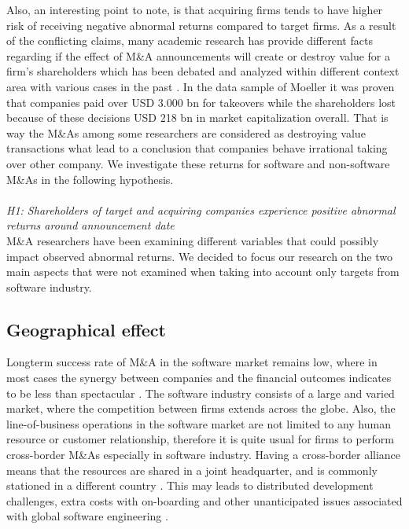Also, an interesting point to note, is that acquiring firms tends to have higher risk of receiving negative abnormal returns compared to target firms. As a result of the conflicting claims, many academic research has provide different facts regarding if the effect of M\&A announcements will create or destroy value for a firm's shareholders which has been debated and analyzed within different context area with various cases in the past \cite{Mateev}. In the data sample of Moeller \cite{MOELLER2005533} it was proven that companies paid over USD 3.000 bn for takeovers while the shareholders lost because of these decisions USD 218 bn in market capitalization overall. That is way the M\&As among some researchers are considered as destroying value transactions \cite{bieshaar2001deals,sundersanam2006} what lead to a conclusion that companies behave irrational taking over other company. We investigate these returns for software and non-software M\&As in the following hypothesis.
\\
\\
\textit{H1: Shareholders of target and acquiring companies experience positive abnormal returns around announcement date}
\\

M\&A researchers have been examining different variables that could possibly impact observed abnormal returns. We decided to focus our research on the two main aspects that were not examined when taking into account only targets from software industry.

\subsection{Geographical effect}

Longterm success rate of M\&A in the software market remains low, where in most cases the synergy between companies and the financial outcomes indicates to be less than spectacular \cite{McCarthy}. The software industry consists of a large and varied market, where the competition between firms extends across the globe. Also, the line-of-business operations in the software market are not limited to any human resource or customer relationship, therefore it is quite usual for firms to perform cross-border M\&As especially in software industry.  Having a cross-border alliance means that the resources are shared in a joint headquarter, and is commonly stationed in a different country \cite{ZHU2015556}. This may leads to distributed development challenges, extra costs with on-boarding and other unanticipated issues associated with global software engineering \cite{4221620,vsmite2010empirical}. 

